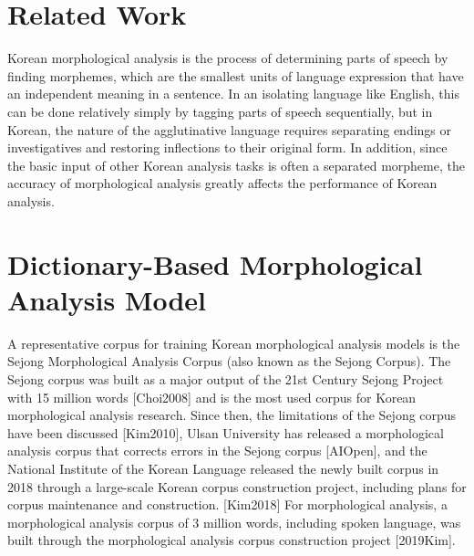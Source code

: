 \documentclass[AMS,STIX2COL]{WileyNJD-v2}
\begin{document}
    \section{Related Work}\label{sec2}

    Korean morphological analysis is the process of determining parts of speech by finding morphemes, which are the smallest units of language expression that have an independent meaning in a sentence.
    In an isolating language like English, this can be done relatively simply by tagging parts of speech sequentially, but in Korean, the nature of the agglutinative language requires separating endings or investigatives and restoring inflections to their original form.
    In addition, since the basic input of other Korean analysis tasks is often a separated morpheme, the accuracy of morphological analysis greatly affects the performance of Korean analysis.



    \section{Dictionary-Based Morphological Analysis Model}\label{sec3}

    A representative corpus for training Korean morphological analysis models is the Sejong Morphological Analysis Corpus (also known as the Sejong Corpus).
    The Sejong corpus was built as a major output of the 21st Century Sejong Project with 15 million words [Choi2008] and is the most used corpus for Korean morphological analysis research.
    Since then, the limitations of the Sejong corpus have been discussed [Kim2010], Ulsan University has released a morphological analysis corpus that corrects errors in the Sejong corpus [AIOpen], and the National Institute of the Korean Language released the newly built corpus in 2018 through a large-scale Korean corpus construction project, including plans for corpus maintenance and construction. [Kim2018]
    For morphological analysis, a morphological analysis corpus of 3 million words, including spoken language, was built through the morphological analysis corpus construction project [2019Kim].

\end{document}
